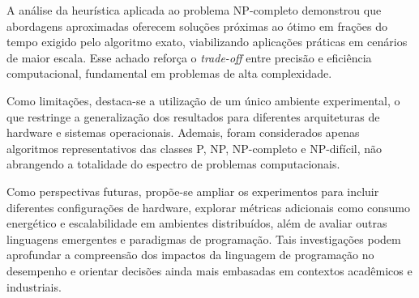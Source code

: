 \documentclass[12pt,a4paper]{article}
\newcommand{\eng}[1]{\textit{#1}}
\begin{document}
A análise da heurística aplicada ao problema NP-completo demonstrou que abordagens aproximadas oferecem soluções próximas ao ótimo em frações do tempo exigido pelo algoritmo exato, viabilizando aplicações práticas em cenários de maior escala. Esse achado reforça o \eng{trade-off} entre precisão e eficiência computacional, fundamental em problemas de alta complexidade.

Como limitações, destaca-se a utilização de um único ambiente experimental, o que restringe a generalização dos resultados para diferentes arquiteturas de hardware e sistemas operacionais. Ademais, foram considerados apenas algoritmos representativos das classes P, NP, NP-completo e NP-difícil, não abrangendo a totalidade do espectro de problemas computacionais.

Como perspectivas futuras, propõe-se ampliar os experimentos para incluir diferentes configurações de hardware, explorar métricas adicionais como consumo energético e escalabilidade em ambientes distribuídos, além de avaliar outras linguagens emergentes e paradigmas de programação. Tais investigações podem aprofundar a compreensão dos impactos da linguagem de programação no desempenho e orientar decisões ainda mais embasadas em contextos acadêmicos e industriais.

\renewcommand{\refname}{REFERÊNCIAS}
\begingroup
{}


\endgroup
\end{document}
